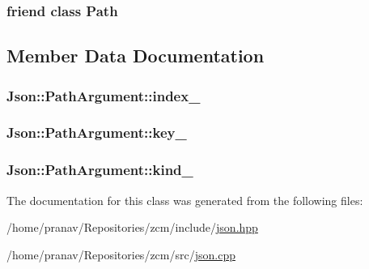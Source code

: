 \subsubsection[{\texorpdfstring{Path}{Path}}]{\setlength{\rightskip}{0pt plus 5cm}friend class {\bf Path}\hspace{0.3cm}{\ttfamily [friend]}}\hypertarget{classJson_1_1PathArgument_a4877239a6b7f09fbf5a61ca68a49d74c}{}\label{classJson_1_1PathArgument_a4877239a6b7f09fbf5a61ca68a49d74c}


\subsection{Member Data Documentation}
\subsubsection[{\texorpdfstring{index\+\_\+}{index_}}]{ Json\+::\+Path\+Argument\+::index\+\_\+\hspace{0.3cm}{\ttfamily [private]}}\hypertarget{classJson_1_1PathArgument_afd5857d1b6bfaae6961333bdae7bd5ec}{}\label{classJson_1_1PathArgument_afd5857d1b6bfaae6961333bdae7bd5ec}
\subsubsection[{\texorpdfstring{key\+\_\+}{key_}}]{ Json\+::\+Path\+Argument\+::key\+\_\+\hspace{0.3cm}{\ttfamily [private]}}\hypertarget{classJson_1_1PathArgument_af4024368548ff730ef2bed97d6f1ca43}{}\label{classJson_1_1PathArgument_af4024368548ff730ef2bed97d6f1ca43}
\subsubsection[{\texorpdfstring{kind\+\_\+}{kind_}}]{ Json\+::\+Path\+Argument\+::kind\+\_\+\hspace{0.3cm}{\ttfamily [private]}}\hypertarget{classJson_1_1PathArgument_ad4bc4b544b155a3d9c7788572ecf991b}{}\label{classJson_1_1PathArgument_ad4bc4b544b155a3d9c7788572ecf991b}


The documentation for this class was generated from the following files\+:\begin{DoxyCompactItemize}
\item 
/home/pranav/\+Repositories/zcm/include/\hyperlink{json_8hpp}{json.\+hpp}\item 
/home/pranav/\+Repositories/zcm/src/\hyperlink{json_8cpp}{json.\+cpp}\end{DoxyCompactItemize}
